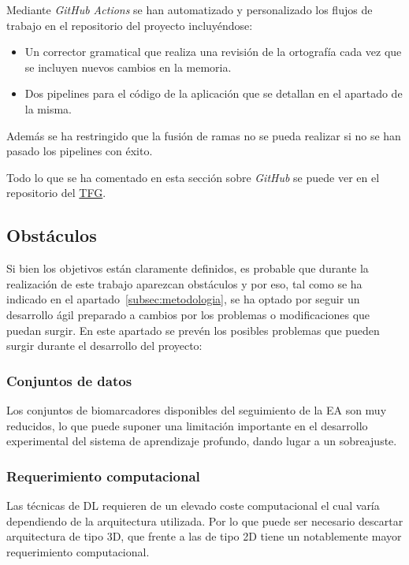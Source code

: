Mediante \textit{GitHub Actions} se han automatizado y personalizado los flujos de trabajo en el repositorio del proyecto
incluyéndose:
\begin{itemize}
    \item Un corrector gramatical que realiza una revisión de la ortografía cada vez que se incluyen nuevos cambios en
    la memoria.
    \item Dos pipelines para el código de la aplicación que se detallan en el apartado de la misma.\\
\end{itemize}

Además se ha restringido que la fusión de ramas no se pueda realizar si no se han pasado los pipelines con éxito.

Todo lo que se ha comentado en esta sección sobre \textit{GitHub} se puede ver en el repositorio del
\href{https://github.com/raquelmolinare/TFG}{TFG}.

\subsection{Obstáculos}\label{subsec:obstaculos}
Si bien los objetivos están claramente definidos, es probable que durante la realización de este trabajo aparezcan 
obstáculos y por eso, tal como se ha indicado en el apartado~\ref{subsec:metodologia}, se ha optado por seguir un
desarrollo ágil preparado a cambios por los problemas o modificaciones que puedan surgir.
En este apartado se prevén los posibles problemas que pueden surgir durante el desarrollo del proyecto:

\subsubsection{Conjuntos de datos}
Los conjuntos de biomarcadores disponibles del seguimiento de la EA son muy reducidos, lo que puede suponer una
limitación importante en el desarrollo experimental del sistema de aprendizaje profundo, dando lugar a un sobreajuste.

\subsubsection{Requerimiento computacional}
Las técnicas de DL requieren de un elevado coste computacional el cual varía dependiendo de la arquitectura utilizada.
Por lo que puede ser necesario descartar arquitectura de tipo 3D, que frente a las de tipo 2D tiene un notablemente
mayor requerimiento computacional.

